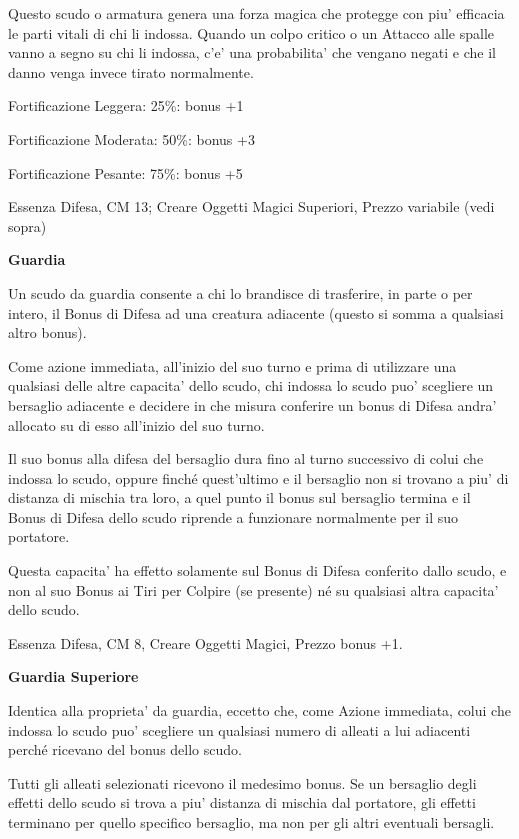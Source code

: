 \documentclass[a4paper,11pt,twoside,openany]{book}
\begin{document}
{		Questo scudo o armatura genera una forza magica che protegge con piu' efficacia le parti vitali di chi li indossa. Quando un colpo critico o un Attacco alle spalle vanno a segno su chi li indossa, c'e' una probabilita' che vengano negati e che il danno venga invece tirato normalmente.
		
		Fortificazione Leggera: 25\%: bonus +1
		
		Fortificazione Moderata: 50\%: bonus +3
		
		Fortificazione Pesante: 75\%: bonus +5
		
		Essenza Difesa, CM 13; Creare Oggetti Magici Superiori, Prezzo variabile (vedi sopra)
		
		\textbf{Guardia}
		
		Un scudo da guardia consente a chi lo brandisce di trasferire, in parte o per intero, il Bonus di Difesa ad una creatura adiacente (questo si somma a qualsiasi altro bonus). 
		
		Come azione immediata, all'inizio del suo turno e prima di utilizzare una qualsiasi delle altre capacita' dello scudo, chi indossa lo scudo puo' scegliere un bersaglio adiacente e decidere in che misura conferire un bonus di Difesa andra' allocato su di esso all'inizio del suo turno.
		
		Il suo bonus alla difesa del bersaglio dura fino al turno successivo di colui che indossa lo scudo, oppure finché quest'ultimo e il bersaglio non si trovano a piu' di distanza di mischia tra loro, a quel punto il bonus sul bersaglio termina e il Bonus di Difesa dello scudo riprende a funzionare normalmente per il suo portatore.
		
		Questa capacita' ha effetto solamente sul Bonus di Difesa conferito dallo scudo, e non al suo Bonus ai Tiri per Colpire (se presente) né su qualsiasi altra capacita' dello scudo.
		
		Essenza Difesa, CM 8, Creare Oggetti Magici, Prezzo bonus +1.
		
		\textbf{Guardia Superiore}
		
		Identica alla proprieta' da guardia, eccetto che, come Azione immediata, colui che indossa lo scudo puo' scegliere un qualsiasi numero di alleati a lui adiacenti perché ricevano del bonus dello scudo. 
		
		Tutti gli alleati selezionati ricevono il medesimo bonus. Se un bersaglio degli effetti dello scudo si trova a piu' distanza di mischia dal portatore, gli effetti terminano per quello specifico bersaglio, ma non per gli altri eventuali bersagli.
		
}
\end{document}

